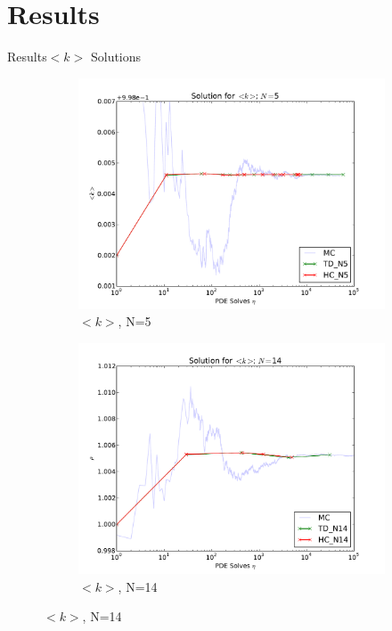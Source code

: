 \documentclass{beamer}
\begin{document}
\section{Results}
\begin{frame}{Results}{$<k>$ Solutions}
  \begin{figure}[h!]
    \centering
    \begin{subfigure}[b]{0.49 \textwidth}
      \includegraphics[width=\textwidth]{../graphics/soln_5}
      \caption{$<k>$, N=5}
      \label{soln_5}
    \end{subfigure}
    \begin{subfigure}[b]{0.49 \textwidth}
      \includegraphics[width=\textwidth]{../graphics/soln_14}
      \caption{$<k>$, N=14}
      \label{soln_14}
    \end{subfigure}
  \end{figure}
\end{frame}
\end{document}
